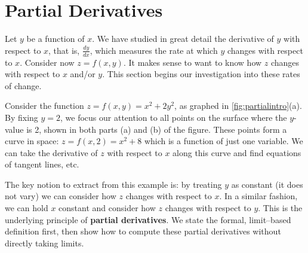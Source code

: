 \section{Partial Derivatives}\label{sec:partial_derivatives}

Let $y$ be a function of $x$. We have studied in great detail the derivative of $y$ with respect to $x$, that is, $\frac{dy}{dx}$, which measures the rate at which $y$ changes with respect to $x$. Consider now $z=f(x,y)$. It makes sense to want to know how $z$ changes with respect to $x$ and/or $y$. This section begins our investigation into these rates of change.


Consider the function $z=f(x,y) = x^2+2y^2$, as graphed in \autoref{fig:partialintro}(a). By fixing $y=2$, we focus our attention to all points on the surface where the $y$-value is 2, shown in both parts (a) and (b) of the figure. These points form a curve in space: $z = f(x,2) = x^2+8$ which is a function of just one variable. We can take the derivative of $z$ with respect to $x$ along this curve and find equations of tangent lines, etc.

The key notion to extract from this example is: by treating $y$ as  constant (it does not vary) we can consider how $z$ changes with respect to $x$. In a similar fashion, we can hold $x$ constant and consider how $z$ changes with respect to $y$. This is the underlying principle of \textbf{partial derivatives}. We state the formal, limit--based definition first, then show how to compute these partial derivatives without directly taking limits.

